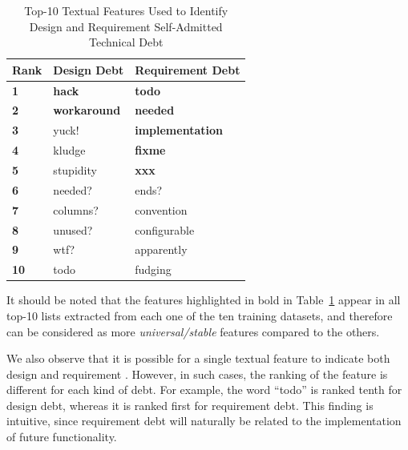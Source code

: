 \begin{table}[!thb]
    \begin{center}
        \caption{Top-10 Textual Features Used to Identify Design and Requirement Self-Admitted Technical Debt}
        \label{chap4:tbl:top_ten_features}
        \vspace{1mm}
        \begin{tabular}{l| l l }
        \toprule
        \textbf{Rank} & \textbf{Design Debt} & \textbf{Requirement Debt}  \\
        \midrule
         \textbf{1}  & \textbf{hack}       &   \textbf{todo}     \\
         \textbf{2}  & \textbf{workaround} &   \textbf{needed}   \\
         \textbf{3}  & yuck!      &   \textbf{implementation}    \\
         \textbf{4}  & kludge     &   \textbf{fixme}             \\
         \textbf{5}  & stupidity  &   \textbf{xxx}               \\
         \textbf{6}  & needed?    &   ends?             \\
         \textbf{7}  & columns?   &   convention        \\
         \textbf{8}  & unused?    &   configurable      \\
         \textbf{9}  & wtf?       &   apparently        \\
         \textbf{10} & todo       &   fudging           \\
        \bottomrule
        \end{tabular}
    \end{center}    
\end{table}

It should be noted that the features highlighted in bold in Table~\ref{chap4:tbl:top_ten_features} appear in all top-10 lists extracted from each one of the ten training datasets, and therefore can be considered as more \textit{universal/stable} features compared to the others.

We also observe that it is possible for a single textual feature to indicate both design and requirement \SATD. However, in such cases, the ranking of the feature is different for each kind of debt. For example, the word ``todo'' is ranked tenth for design debt, whereas it is ranked first for requirement debt. This finding is intuitive, since requirement debt will naturally be related to the implementation of future functionality.

